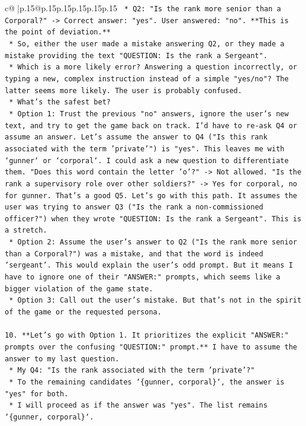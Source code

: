\documentclass{article}
\begin{document}
{\begin{supertabular}{c@{$\;$}|p{.15\linewidth}@{}p{.15\linewidth}p{.15\linewidth}p{.15\linewidth}p{.15\linewidth}p{.15\linewidth}}
{{{\texttt{            *   Q2: "Is the rank more senior than a Corporal?" {-}> Correct answer: "yes". User answered: "no". **This is the point of deviation.**} \\
\texttt{    *   So, either the user made a mistake answering Q2, or they made a mistake providing the text "QUESTION: Is the rank a Sergeant".} \\
\texttt{    *   Which is a more likely error? Answering a question incorrectly, or typing a new, complex instruction instead of a simple "yes/no"? The latter seems more likely. The user is probably confused.} \\
\texttt{    *   What's the safest bet?} \\
\texttt{        *   Option 1: Trust the previous "no" answers, ignore the user's new text, and try to get the game back on track. I'd have to re{-}ask Q4 or assume an answer. Let's assume the answer to Q4 ("Is this rank associated with the term 'private'") is "yes". This leaves me with `gunner` or `corporal`. I could ask a new question to differentiate them. "Does this word contain the letter 'o'?" {-}> Not allowed. "Is the rank a supervisory role over other soldiers?" {-}> Yes for corporal, no for gunner. That's a good Q5. Let's go with this path. It assumes the user was trying to answer Q3 ("Is the rank a non{-}commissioned officer?") when they wrote "QUESTION: Is the rank a Sergeant". This is a stretch.} \\
\texttt{        *   Option 2: Assume the user's answer to Q2 ("Is the rank more senior than a Corporal?") was a mistake, and that the word is indeed 'sergeant'. This would explain the user's odd prompt. But it means I have to ignore one of their "ANSWER:" prompts, which seems like a bigger violation of the game state.} \\
\texttt{        *   Option 3: Call out the user's mistake. But that's not in the spirit of the game or the requested persona.} \\
\\ 
\texttt{10. **Let's go with Option 1. It prioritizes the explicit "ANSWER:" prompts over the confusing "QUESTION:" prompt.** I have to assume the answer to my last question.} \\
\texttt{    *   My Q4: "Is the rank associated with the term 'private'?"} \\
\texttt{    *   To the remaining candidates `\{gunner, corporal\}`, the answer is "yes" for both.} \\
\texttt{    *   I will proceed as if the answer was "yes". The list remains `\{gunner, corporal\}`.} \\
}}}
\end{supertabular}}
\end{document}
